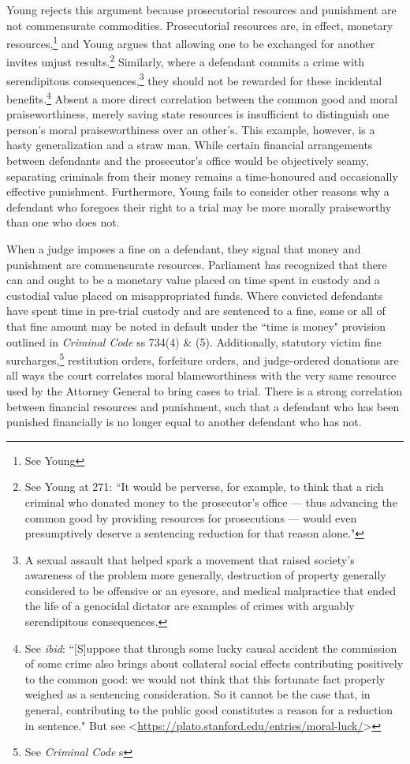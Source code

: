 Young rejects this argument because prosecutorial resources and punishment are not commensurate commodities. Prosecutorial resources are, in effect, monetary resources,\footnote{See Young} and Young argues that allowing one to be exchanged for another invites unjust results.\footnote{See Young at 271: ``It would be perverse, for example, to think that a rich criminal who donated money to the prosecutor's office — thus advancing the common good by providing resources for prosecutions — would even presumptively deserve a sentencing reduction for that reason alone."} Similarly, where a defendant commits a crime with serendipitous consequences,\footnote{A sexual assault that helped spark a movement that raised society's awareness of the problem more generally, destruction of property generally considered to be offensive or an eyesore, and medical malpractice that ended the life of a genocidal dictator are examples of crimes with arguably serendipitous consequences.} they should not be rewarded for these incidental benefits.\footnote{See \textit{ibid}: ``[S]uppose that through some lucky causal accident the commission of some crime also brings about collateral social effects contributing positively to the common good: we would not think that this fortunate fact properly weighed as a sentencing consideration. So it cannot be the case that, in general, contributing to the public good constitutes a reason for a reduction in sentence." But see \textless \url{https://plato.stanford.edu/entries/moral-luck/}\textgreater} Absent a more direct correlation between the common good and moral praiseworthiness, merely saving state resources is insufficient to distinguish one person's moral praiseworthiness over an other's. This example, however, is a hasty generalization and a straw man. While certain financial arrangements between defendants and the prosecutor's office would be objectively seamy, separating criminals from their money remains a time-honoured and occasionally effective punishment. Furthermore, Young fails to consider other reasons why a defendant who foregoes their right to a trial may be more morally praiseworthy than one who does not.

When a judge imposes a fine on a defendant, they signal that money and punishment are commensurate resources. Parliament has recognized that there can and ought to be a monetary value placed on time spent in custody and a custodial value placed on misappropriated funds. Where convicted defendants have spent time in pre-trial custody and are sentenced to a fine, some or all of that fine amount may be noted in default under the ``time is money" provision outlined in \textit{Criminal Code} ss 734(4) \& (5). Additionally, statutory victim fine surcharges,\footnote{See \textit{Criminal Code} s } restitution orders, forfeiture orders, and judge-ordered donations are all ways the court correlates moral blameworthiness with the very same resource used by the Attorney General to bring cases to trial. There is a strong correlation between financial resources and punishment, such that a defendant who has been punished financially is no longer equal to another defendant who has not.


